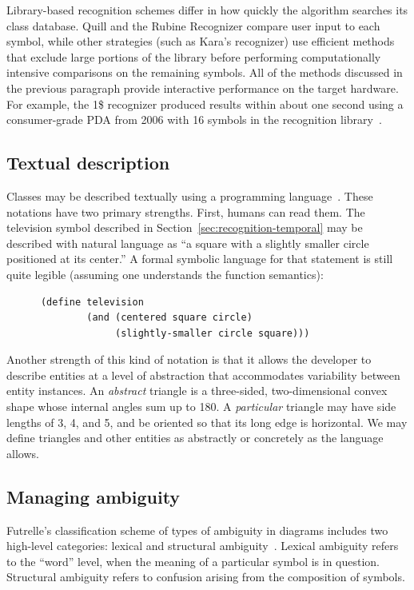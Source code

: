 Library-based recognition schemes differ in how quickly the algorithm
searches its class database. Quill and the Rubine Recognizer compare
user input to each symbol, while other strategies (such as Kara's
recognizer) use efficient methods that exclude large portions of the
library before performing computationally intensive comparisons on the
remaining symbols. All of the methods discussed in the previous
paragraph provide interactive performance on the target hardware. For
example, the 1\$ recognizer produced results within about one second
using a consumer-grade PDA from 2006 with 16 symbols in the
recognition library~\cite{wobbrock-dollar}.

\subsection{Textual description}

Classes may be described textually using a programming
language~\cite{pasternak-adik,bimber-sketch-bnf,costagliola-xpg,hammond-ladder}. These
notations have two primary strengths. First, humans can read them. The
television symbol described in Section~\ref{sec:recognition-temporal}
may be described with natural language as ``a square with a slightly
smaller circle positioned at its center.'' A formal symbolic language
for that statement is still quite legible (assuming one understands
the function semantics):

\begin{verbatim}
      (define television 
              (and (centered square circle)
                   (slightly-smaller circle square)))
\end{verbatim}

Another strength of this kind of notation is that it allows the
developer to describe entities at a level of abstraction that
accommodates variability between entity
instances. An \textit{abstract} triangle is a three-sided,
two-dimensional convex shape whose internal angles sum up to
180\degree. A \textit{particular} triangle may have side lengths of 3,
4, and 5, and be oriented so that its long edge is horizontal. We may
define triangles and other entities as abstractly or concretely as the
language allows.

\subsection{Managing ambiguity}
\label{sec:recognition-managing-ambiguity}

Futrelle's classification scheme of types of ambiguity in diagrams
includes two high-level categories: lexical and structural
ambiguity~\cite{futrelle-ambigutiy}. Lexical ambiguity refers to the
``word'' level, when the meaning of a particular symbol is in
question. Structural ambiguity refers to confusion arising from the
composition of symbols.

